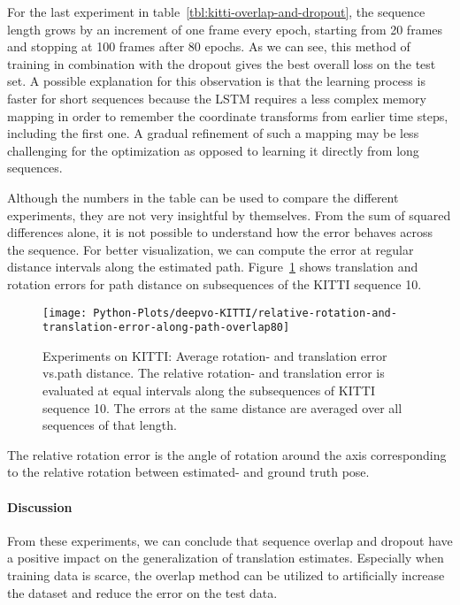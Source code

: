 		For the last experiment in table~\ref{tbl:kitti-overlap-and-dropout}, the sequence length grows by an increment of one frame every epoch, starting from 20 frames and stopping at 100 frames after 80 epochs.
		As we can see, this method of training in combination with the dropout gives the best overall loss on the test set.
		A possible explanation for this observation is that the learning process is faster for short sequences because the LSTM requires a less complex memory mapping in order to remember the coordinate transforms from earlier time steps, including the first one.
		A gradual refinement of such a mapping may be less challenging for the optimization as opposed to learning it directly from long sequences.
		
		Although the numbers in the table can be used to compare the different experiments, they are not very insightful by themselves.
		From the sum of squared differences alone, it is not possible to understand how the error behaves across the sequence.
		For better visualization, we can compute the error at regular distance intervals along the estimated path.
		Figure~\ref{fig:kitti-avg-rotation-translation-error-vs-path-distance} shows translation and rotation errors for path distance on subsequences of the KITTI sequence 10.
		\begin{figure}[t]
			\centering
			\texttt{[image: Python-Plots/deepvo-KITTI/relative-rotation-and-translation-error-along-path-overlap80]}
			\caption[Experiments on KITTI: Average rotation- and translation error vs.\@ path distance]
					{Experiments on KITTI: Average rotation- and translation error vs.\@ path distance.
					 The relative rotation- and translation error is evaluated at equal intervals along the subsequences of KITTI sequence 10.
					 The errors at the same distance are averaged over all sequences of that length.
					 \label{fig:kitti-avg-rotation-translation-error-vs-path-distance}}
		\end{figure}
		The relative rotation error is the angle of rotation around the axis corresponding to the relative rotation between estimated- and ground truth pose.
		
		\paragraph{Discussion}
		From these experiments, we can conclude that sequence overlap and dropout have a positive impact on the generalization of translation estimates.
		Especially when training data is scarce, the overlap method can be utilized to artificially increase the dataset and reduce the error on the test data.
		
